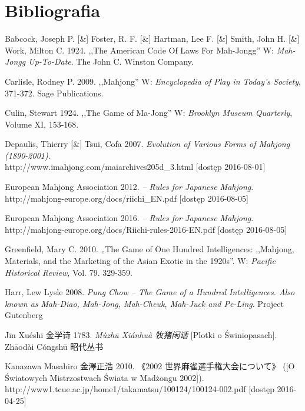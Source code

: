 \onecolumn
\section*{Bibliografia}
\setlength{\parindent}{0pt}
\setlength{\parskip}{1ex plus 0.5ex minus 0.2ex}
Babcock, Joseph P. [\&] Foster, R. F. [\&] Hartman, Lee F. [\&] Smith, John H.
[\&] Work, Milton C. 1924. ,,The American Code Of Laws For Mah-Jongg'' W:
\textit{Mah-Jongg Up-To-Date}. The John C. Winston Company. 


Carlisle, Rodney P. 2009. ,,Mahjong'' W: \textit{Encyclopedia of Play in Today's
Society}, 371-372.
Sage Publications.

Culin, Stewart 1924. ,,The Game of Ma-Jong'' W: \textit{Brooklyn Museum
Quarterly}, Volume XI, 153-168.

Depaulis, Thierry [\&] Tsui, Cofa 2007. \textit{Evolution of Various Forms of
Mahjong (1890-2001)}. 
\\http://www.imahjong.com/maiarchives205d\_3.html [dostęp
2016-08-01]

European Mahjong Association 2012. \textit{ -- Rules for Japanese Mahjong}.
\\http://mahjong-europe.org/docs/riichi\_EN.pdf [dostęp 2016-08-05]

European Mahjong Association 2016. \textit{ -- Rules for Japanese Mahjong}.
\\http://mahjong-europe.org/docs/Riichi-rules-2016-EN.pdf [dostęp 2016-08-05]

Greenfield, Mary C. 2010. „The Game of One Hundred Intelligences: ,,Mahjong,
Materials, and the Marketing of the Asian Exotic in the 1920s''. W:
\textit{Pacific Historical Review}, Vol. 79. 329-359.

Harr, Lew Lysle 2008. \textit{Pung Chow -- The Game of a Hundred Intelligences.
Also known as Mah-Diao, Mah-Jong, Mah-Cheuk, Mah-Juck and Pe-Ling}. Project
Gutenberg

Jīn Xuéshī 金学诗 1783. \textit{Mùzhū Xiánhuà 牧猪闲话} [Plotki o Świniopasach].
Zhāodài Cóngshū 昭代丛书

Kanazawa Masahiro 金澤正浩 2010.  《2002 世界麻雀選手権大会について》 ([O Światowych Mistrzostwach
Świata w Madżongu 2002]).
\\http://www1.tcue.ac.jp/home1/takamatsu/100124/100124-002.pdf [dostęp
2016-04-25]

